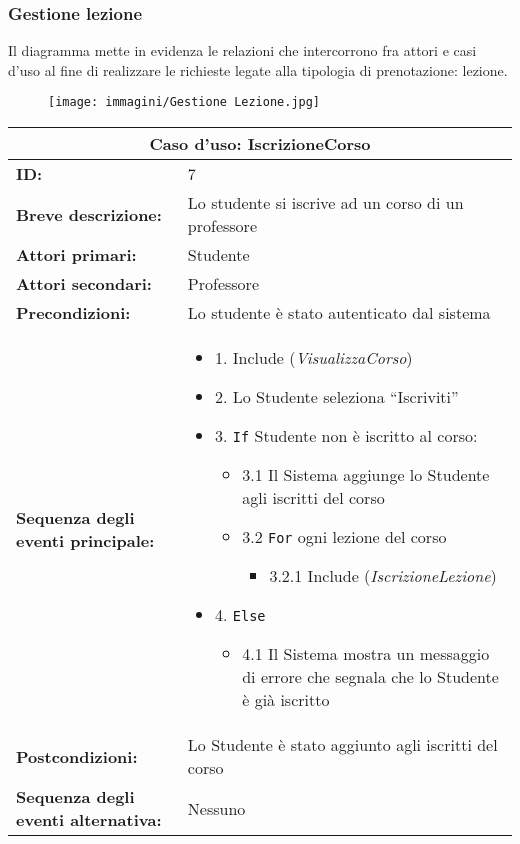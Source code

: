 \documentclass[11pt,a4paper]{report}
\begin{document}
\newpage




\subsubsection{Gestione lezione}
Il diagramma mette in evidenza le relazioni che intercorrono fra attori e casi d'uso al fine di realizzare le richieste legate alla tipologia 
di prenotazione: lezione. \\
\begin{figure}[h!]
  \centering
\texttt{[image: immagini/Gestione Lezione.jpg]}
\end{figure}

\newpage
\begin{longtable}{|p{4cm}|p{10cm}|}
\hline
\multicolumn{2}{|c|}{\textbf{Caso d’uso: IscrizioneCorso}} \\
\hline
\textbf{ID:} & 7 \\
\hline
\textbf{Breve descrizione:} & Lo studente si iscrive ad un corso di un professore \\
\hline
\textbf{Attori primari:} & Studente \\
\hline
\textbf{Attori secondari:} & Professore \\
\hline
\textbf{Precondizioni:} & Lo studente è stato autenticato dal sistema \\
\hline
\textbf{Sequenza degli eventi principale:} &
\begin{itemize}[leftmargin=*, label={}]
  \item 1. Include (\textit{VisualizzaCorso})
  \item 2. Lo Studente seleziona “Iscriviti”
  \item 3. \texttt{If} Studente non è iscritto al corso:
  \begin{itemize}[leftmargin=1.5em, label={}]
    \item 3.1 Il Sistema aggiunge lo Studente agli iscritti del corso
    \item 3.2 \texttt{For} ogni lezione del corso
    \begin{itemize}[leftmargin=2em, label={}]
      \item 3.2.1 Include (\textit{IscrizioneLezione})
    \end{itemize}
  \end{itemize}
  \item 4. \texttt{Else}
  \begin{itemize}[leftmargin=1.5em, label={}]
    \item 4.1 Il Sistema mostra un messaggio di errore che segnala che lo Studente è già iscritto
  \end{itemize}
\end{itemize}
\\
\hline
\textbf{Postcondizioni:} & Lo Studente è stato aggiunto agli iscritti del corso \\
\hline
\textbf{Sequenza degli eventi alternativa:} & Nessuno \\
\hline
\end{longtable}
\end{document}
